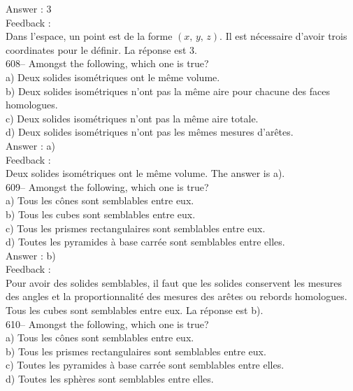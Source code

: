 ﻿\documentclass[letterpaper, 12pt]{article}
\begin{document}
Answer : 3\\

Feedback : \\
Dans l'espace, un point est de la forme $\left(x,\,y,\,z\right) $.  Il est
n\'ecessaire d'avoir trois coordinates pour le d\'efinir.  La r\'eponse
est 3.\\

608-- Amongst the following, which one is true?\\
a) Deux solides isom\'etriques ont le m\^eme volume.\\
b) Deux solides isom\'etriques n'ont pas la m\^eme aire pour chacune des
faces homologues.\\
c) Deux solides isom\'etriques n'ont pas la m\^eme aire totale.\\
d) Deux solides isom\'etriques n'ont pas les m\^emes mesures d'ar\^etes.\\


Answer : a)\\

Feedback : \\
Deux solides isom\'etriques ont le m\^eme volume.  The answer is a).\\

609-- Amongst the following, which one is true?\\
a) Tous les c\^ones sont semblables entre eux.\\
b) Tous les cubes sont semblables entre eux.\\
c) Tous les prismes rectangulaires sont semblables entre eux.\\
d) Toutes les pyramides \`a base carr\'ee sont semblables entre elles.\\

Answer : b)\\

Feedback : \\
Pour avoir des solides semblables, il faut que les solides conservent les
mesures des angles et la proportionnalit\'e des mesures des ar\^etes ou
rebords homologues.  Tous les cubes sont semblables entre eux.  La r\'eponse
est b).\\

610-- Amongst the following, which one is true?\\
a) Tous les c\^ones sont semblables entre eux.\\
b) Tous les prismes rectangulaires sont semblables entre eux.\\
c) Toutes les pyramides \`a base carr\'ee sont semblables entre elles.\\
d) Toutes les sph\`eres sont semblables entre elles.\\
\end{document}

